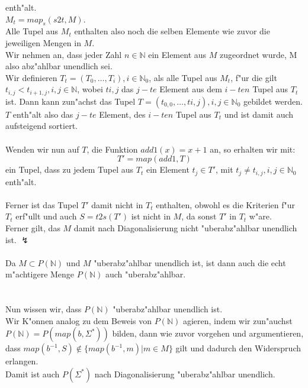 \documentclass{article}
\newcommand{\gap}{\null\ \\ \\}
\begin{document}
    enth"alt.\\
$M_t = map_s(s2t, M)$.\\
Alle Tupel aus $M_t$ enthalten also noch
    die selben Elemente wie zuvor die jeweiligen Mengen in $M$.\\
Wir nehmen an, dass jeder Zahl $n \in \mathbb{N}$ ein Element aus $M$
    zugeordnet wurde, M also abz"ahlbar unendlich sei.\\
Wir definieren $T_t = (T_0, \ldots, T_i), i \in \mathbb{N}_0$, als alle 
    Tupel aus $M_t$, f"ur die gilt $t_{i,j} < t_{i+1,j}, i,j \in \mathbb{N}$, 
    wobei $t{i,j}$ das $j-te$ Element aus dem $i-ten$ Tupel aus $T_t$ ist.
    Dann kann zun"achst das Tupel $
    T = (t_{0,0}, \ldots, t{i,j}), i,j \in \mathbb{N}_0
    $ gebildet werden. $T$ enth"alt also das $j-te$ Element, des $i-ten$ Tupel 
    aus $T_t$ und ist damit auch aufsteigend sortiert.\\
\\
Wenden wir nun auf $T$, die Funktion $add1(x) = x+1$ an, so erhalten wir
    mit:\[
    T' = map(add1, T)
    \]
ein Tupel, dass zu jedem Tupel aus $T_t$ ein
    Element $t_j \in T'$, mit $t_j \neq t_{i,j}, i,j \in \mathbb{N}_0$ enth"alt.\\
\\
Ferner ist das Tupel $T'$ damit nicht in $T_t$ enthalten, obwohl es die Kriterien 
    f"ur $T_t$ erf"ullt und auch $S=t2s(T')$ ist nicht in $M$, da sonst
    $T'$ in $T_t$ w"are.\\
Ferner gilt, das $M$ damit nach Diagonalisierung nicht "uberabz"ahlbar unendlich
    ist. $\lightning$\\
\\
Da $M \subset P(\mathbb{N})$ und $M$ "uberabz"ahlbar unendlich ist, ist dann auch
    die echt m"achtigere Menge $P(\mathbb{N})$ auch "uberabz"ahlbar.\\
\gap
Nun wissen wir, dass $P(\mathbb{N})$ "uberabz"ahlbar unendlich ist.\\
Wir K"onnen analog zu dem Beweis von $P(\mathbb{N})$ agieren, indem wir 
    zun"auchst $P(\mathbb{N}) = P(map(b, \Sigma^*))$ bilden, dann wie zuvor 
    vorgehen und argumentieren, dass 
    $map(b^{-1}, S) \not \in \{map(b^{-1}, m) | m \in M\}$ gilt
    und dadurch den Widerspruch erlangen.\\
Damit ist auch $P(\Sigma^*)$ nach Diagonalisierung "uberabz"ahlbar unendlich.\\
\end{document}
